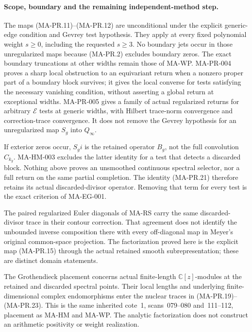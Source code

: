 \paragraph{Scope, boundary and the remaining independent-method step.}
The maps (MA-PR.11)--(MA-PR.12) are unconditional under
the explicit generic-edge condition and Gevrey test
hypothesis.  They apply at every fixed polynomial
weight $s\ge0$, including the requested $s\ge3$.
No boundary jets occur in those unregularized maps
because (MA-PR.2) excludes boundary zeros.
The exact boundary truncations at other widths
remain those of MA-WP.  MA-PR-004 proves a sharp
local obstruction to an equivariant return when
a nonzero proper part of a boundary block survives;
it gives the local converse for tests satisfying
the necessary vanishing condition, without
asserting a global return at exceptional widths.
MA-PR-005 gives a family of actual regularized
returns for arbitrary $\mathcal E$ tests at
generic widths, with Hilbert trace-norm convergence
and correction-trace convergence.  It does not
remove the Gevrey hypothesis for an unregularized
map $S_g$ into $Q_\infty$.

If exterior zeros occur, $S_gi$ is the retained
operator $B_g$, not the full convolution $C_{k_g}$.
MA-HM-003 excludes the latter identity for a test
that detects a discarded block.
Nothing above proves an unsmoothed continuous
spectral selector, nor a full return on the same
partial completion.  The identity (MA-PR.21)
therefore retains its actual discarded-divisor
operator.  Removing that term for every test is
the exact criterion of MA-EG-001.

The paired regularized Euler diagonals of MA-RS
carry the same discarded-divisor trace in their
contour correction.  That agreement does not
identify the unbounded inverse composition there
with every off-diagonal map in Meyer's original
common-space projection.  The factorization
proved here is the explicit map (MA-PR.15) through
the actual retained smooth subrepresentation;
these are distinct domain statements.

The Grothendieck placement concerns actual finite-length
$\mathbb C[z]$-modules at the retained and discarded
spectral points.  Their local lengths and underlying
finite-dimensional complex endomorphisms enter the
nuclear traces in (MA-PR.19)--(MA-PR.23).
This is the same inherited cote~1, scans~079--080
and~111--112, placement as MA-HM and MA-WP.
The analytic factorization does not construct an
arithmetic positivity or weight realization.

